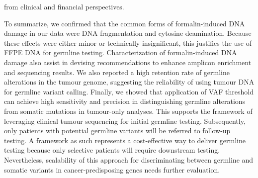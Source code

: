 from clinical and financial perspectives.

To summarize, we confirmed that the common forms of formalin-induced DNA damage in our data were DNA fragmentation and cytosine deamination. Because these effects were either minor or technically insignificant, this justifies the use of FFPE DNA for germline testing. Characterization of formalin-induced DNA damage also assist in devising recommendations to enhance amplicon enrichment and sequencing results. We also reported a high retention rate of germline alterations in the tumour genome, suggesting the reliability of using tumour DNA for germline variant calling. Finally, we showed that application of VAF threshold can achieve high sensitivity and precision in distinguishing germline alterations from somatic mutations in tumour-only analyses. This supports the framework of leveraging clinical tumour sequencing for initial germline testing. Subsequently, only patients with potential germline variants will be referred to follow-up testing. A framework as such represents a cost-effective way to deliver germline testing because only selective patients will require downstream testing. Nevertheless, scalability of this approach for discriminating between germline and somatic variants in cancer-predisposing genes needs further evaluation.
